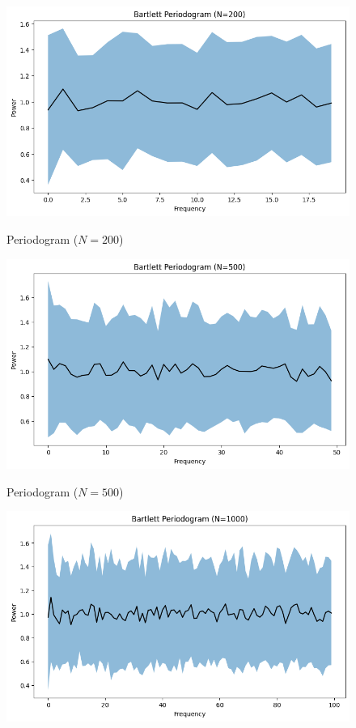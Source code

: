 \documentclass[11pt]{article}
\begin{document}
\begin{solution}
    
\begin{figure}
    \centering
    \begin{minipage}[t]{0.3\textwidth}
    \centerline{\includegraphics[width=\textwidth]{figures/bartlett_periodogram_N200.png}}
    \centerline{Periodogram ($N=200$)}
    \end{minipage}
    \begin{minipage}[t]{0.3\textwidth}
    \centerline{\includegraphics[width=\textwidth]{figures/bartlett_periodogram_N500.png}}
    \centerline{Periodogram ($N=500$)}
    \end{minipage}
    \begin{minipage}[t]{0.3\textwidth}
    \centerline{\includegraphics[width=\textwidth]{figures/bartlett_periodogram_N1000.png}}

\end{minipage}
\end{figure}
\end{solution}
\end{document}
